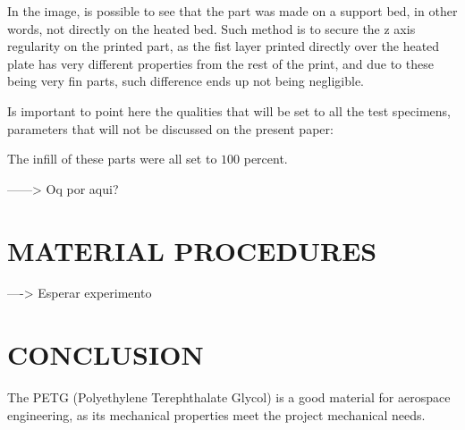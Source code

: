 \documentclass[10pt,fleqn,a4paper,twoside]{article}
\begin{document}
In the image, is possible to see that the part was made on a support bed, in other words, not directly on the heated bed. Such method is to secure the z axis regularity on the printed part, as the fist layer printed directly over the heated plate has very different properties from the rest of the print, and due to these being very fin parts, such difference ends up not being 
negligible. 

Is important to point here the qualities that will be set to all the test specimens, parameters that will not be discussed on the present paper:

The infill of these parts were all set to $ 100 $ percent.


------> Oq por aqui?






%






\section{MATERIAL PROCEDURES}




----> Esperar experimento



\section{CONCLUSION}
The PETG (Polyethylene Terephthalate Glycol) is a good material for aerospace engineering, as its mechanical properties meet the project mechanical needs. 
\end{document}
